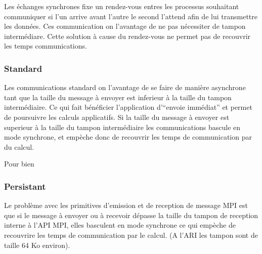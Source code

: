\par Les échanges synchrones fixe un rendez-vous entres les  processus souhaitant communiquer
si l'un arrive avant l'autre le second l'attend afin de lui transmettre les données. 
Ces communication on l'avantage de ne pas nécessiter de tampon intermédiare.
Cette solution à cause du rendez-vous ne permet pas de recouvrir les temps communications.\\

\subsubsection{Standard}

\par Les communications standard on l'avantage de se faire de manière asynchrone tant que 
la taille du message à envoyer est inferieur à la taille du tampon intermédiaire. Ce qui 
fait bénéficier l'application d'``envoie immédiat'' et permet de poursuivre les calculs
applicatifs. Si la taille du message à envoyer est superieur à la taille du tampon
intermédiaire les communications bascule en mode synchrone, et empèche donc de 
recouvrir les temps de communication par du calcul.\\

\par Pour bien 

\subsubsection{Persistant}


\par Le problème avec les primitives d'emission et de reception de message MPI est que si le message 
à envoyer ou à recevoir dépasse la taille du tampon de reception interne à l'API MPI,
elles basculent en mode synchrone ce qui empèche de recouvrire les temps de communication
par le calcul. (A l'ARI les tampon sont de taille 64 Ko environ).\\

